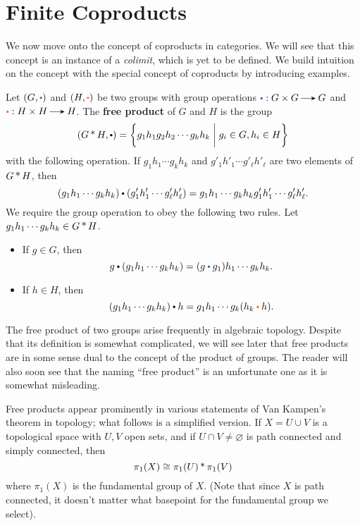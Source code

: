 \newpage
\section{Finite Coproducts}

We now move onto the concept of coproducts in categories. We will see that this concept 
is an instance of a \emph{colimit}, which is yet to be defined. We build intuition 
on the concept with the special concept of coproducts by introducing examples. 

\begin{example}\label{example:free_product}
    Let $(G, \textcolor{NavyBlue}{\bigcdot})$ and $(H, \textcolor{Orange}{\bigcdot})$
    be two groups with group operations $\textcolor{NavyBlue}{\bigcdot}: G \times G \to G $
    and $\textcolor{Orange}{\bigcdot}:  H \times H \to H$. The 
    \textbf{free product} of $G$ and $H$ is the group 
    \[
        (G \* H, \bigcdot) = \bigg\{ g_1h_1g_2h_2\cdots g_kh_k \;\bigg|\; g_i \in G, h_i \in H \bigg\}
    \] 
    with the following operation. If $g_1h_1\cdots g_kh_k$ and $g'_1h'_1\cdots g'_{\ell}h'_{\ell}$
    are two elements of $G \operatorname{\mathbin{*}} H$, then 
    \[
        (g_1h_1\cdots g_kh_k) \mathbin{\bigcdot} (g'_1h'_1\cdots g'_{\ell } h'_{\ell } )
        = 
        g_1h_1\cdots g_kh_k g'_1h'_1 \cdots g'_{\ell}h'_{\ell}.
    \]
    We require the group operation to obey the following two rules. Let $g_1h_1\cdots g_kh_k \in G \operatorname{\mathbin{*}} H$.
    \begin{itemize}
        \item If $g \in G$, then 
        \[
            g \mathbin{\bigcdot} (g_1h_1\cdots g_kh_k) = (g \mathbin{\textcolor{NavyBlue}{\bigcdot}} g_1)h_1\cdots g_kh_k.
        \]
        \item If $h \in H$, then 
        \[
            (g_1h_1\cdots g_kh_k)\mathbin{\bigcdot} h = g_1h_1\cdots g_k(h_k \mathbin{\textcolor{Orange}{\bigcdot}} h).
        \]
    \end{itemize}
    The free product of two groups arise frequently in algebraic topology.
    Despite that its definition is somewhat complicated, we will see later
    that free products are in some sense dual to the concept of the product of groups. 
    The reader will also soon see that the naming ``free product'' is an unfortunate one 
    as it is somewhat misleading.

    Free products appear prominently in various statements of Van Kampen's theorem in topology; what 
    follows is a simplified version.
    If $X = U \cup V$ is a topological space with $U, V$ open sets, and 
    if $U \cap V \ne \varnothing$ is path connected and simply connected, then 
    \[
        \pi_1(X) \cong \pi_1(U)\operatorname{\mathbin{*}} \pi_1(V)
    \]
    where $\pi_1(X)$ is the fundamental group of $X$. (Note that since $X$ is path connected, 
    it doesn't matter what basepoint for the fundamental group we select). 
\end{example}

